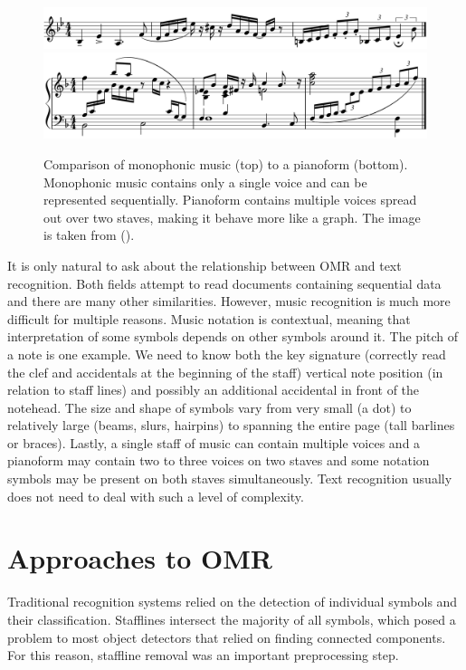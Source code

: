 \begin{figure}[ht]
    \centering
    \includegraphics[width=145mm]{../img/music-monophonic.png}
    \includegraphics[width=145mm]{../img/music-pianoform.png}
    \caption{Comparison of monophonic music (top) to a pianoform (bottom). Monophonic music contains only a single voice and can be represented sequentially. Pianoform contains multiple voices spread out over two staves, making it behave more like a graph. The image is taken from (\cite{UnderstandingOmr}).}
    \label{fig:MusicComplexity}
\end{figure}

It is only natural to ask about the relationship between OMR and text recognition. Both fields attempt to read documents containing sequential data and there are many other similarities. However, music recognition is much more difficult for multiple reasons. Music notation is contextual, meaning that interpretation of some symbols depends on other symbols around it. The pitch of a note is one example. We need to know both the key signature (correctly read the clef and accidentals at the beginning of the staff) vertical note position (in relation to staff lines) and possibly an additional accidental in front of the notehead. The size and shape of symbols vary from very small (a dot) to relatively large (beams, slurs, hairpins) to spanning the entire page (tall barlines or braces). Lastly, a single staff of music can contain multiple voices and a pianoform may contain two to three voices on two staves and some notation symbols may be present on both staves simultaneously. Text recognition usually does not need to deal with such a level of complexity.


\section{Approaches to OMR}

Traditional recognition systems relied on the detection of individual symbols and their classification. Stafflines intersect the majority of all symbols, which posed a problem to most object detectors that relied on finding connected components. For this reason, staffline removal was an important preprocessing step.

